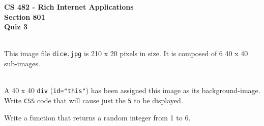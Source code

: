 \documentclass[letterpaper]{exam}
\begin{document}
\begin{center}
	\textbf{CS 482 - Rich Internet Applications} \\
	\textbf{Section 801} \\
	\textbf{Quiz 3} \\
	\vspace{5mm}
	 \\
\end{center}


\begin{questions}
	\question[5] This image file \texttt{dice.jpg} is 210 x 20 pixels in size. It is composed of 6 40 x 40 sub-images.
		\begin{figure}[ht!]
			\centering
		\end{figure}
	\\
		A 40 x 40 \texttt{div} (\texttt{id="this"}) has been assigned this image as its background-image. Write \texttt{CSS} code that will cause just the \texttt{5} to be displayed.
	
	\question[5] Write a function that returns a random integer from 1 to 6.
		
\end{questions}
\end{document}
